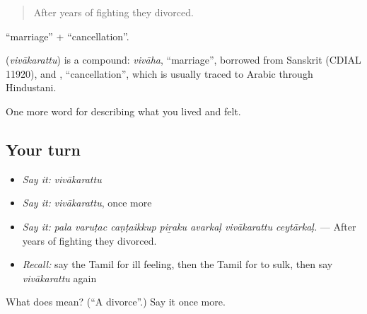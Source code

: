 \begin{quote}
After years of fighting they divorced.
\end{quote}

 \textquotedblleft{}marriage\textquotedblright{} +  \textquotedblleft{}cancellation\textquotedblright{}.

\begin{cousinweb}
\textbf{} (\emph{vivākarattu}) is a compound: \emph{vivāha}, \textquotedblleft{}marriage\textquotedblright{}, borrowed from Sanskrit (CDIAL 11920), and , \textquotedblleft{}cancellation\textquotedblright{}, which is usually traced to Arabic through Hindustani.
\end{cousinweb}

\begin{grammarlens}[title={What you've built}]
One more word for describing what you lived and felt.
\end{grammarlens}

\subsection*{Your turn}
\begin{itemize}
\raggedright
  \item \emph{Say it:} \emph{vivākarattu}
  \item \emph{Say it:} \emph{vivākarattu}, once more
  \item \emph{Say it:} \emph{pala varuṭac caṇṭaikkup piṟaku avarkaḷ vivākarattu ceytārkaḷ.} — After years of fighting they divorced.
  \item \emph{Recall:} say the Tamil for ill feeling, then the Tamil for to sulk, then say \emph{vivākarattu} again
\end{itemize}

\begin{tcolorbox}[breakable,colback=teal!4,colframe=teal!35!black,title={Before you move on}]
What does  mean? (\textquotedblleft{}A divorce\textquotedblright{}.) Say it once more.
\end{tcolorbox}
